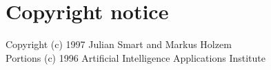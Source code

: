 \begin{comment}
\winhelponly{
\chapter*{wxWindows class library reference}\label{winhelpcontents}

\center{
}%

\sethotspotcolour{off}%
\sethotspotunderline{on}%
\large{
\image{}{cpp.bmp} \helpref{Alphabetical class reference}{classref}

\image{}{shelves.bmp} \helpref{Classes by category}{classesbycat}

\image{}{book1.bmp} \helpref{Topic overviews}{overviews}

\image{}{hand1.bmp} \helpref{Guide to wxWindows}{wxwinchapters}
}
\sethotspotcolour{on}%
\sethotspotunderline{on}%

\chapter*{Overview of wxWindows}\label{wxwinchapters}

\helpref{Introduction}{introduction}\\
\helpref{The wxWindows resource system}{resourceformats}\\
\helpref{Utilities}{utilities}\\
\helpref{Programming strategies}{strategies}\\
\helpref{Bugs and future directions}{bugs}\\
\helpref{References}{bibliography}
}
\end{comment}

\chapter*{Copyright notice}
%
\setfooter{\thepage}{}{}{}{}{\thepage}%

\begin{center}
Copyright (c) 1997 Julian Smart and Markus Holzem\\
Portions (c) 1996 Artificial Intelligence Applications Institute\\
\end{center}

